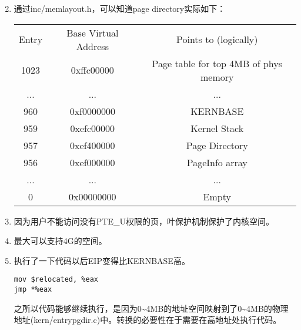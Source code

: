\begin{answer}
    \begin{enumerate}
        \setcounter{enumi}{1}
    \item 通过inc/memlayout.h，可以知道page directory实际如下：
        \begin{center}
            \begin{tabular}{c c c}
                \toprule
                Entry & Base Virtual Address & Points to (logically) \\
                \cmidrule(lr){1-3}
                1023 & 0xffc00000 & Page table for top 4MB of phys memory \\
                ...  & ...        & ...           \\
                960  & 0xf0000000 & KERNBASE      \\
                959  & 0xefc00000 & Kernel Stack  \\
                957  & 0xef400000 & Page Directory\\
                956  & 0xef000000 & PageInfo array\\
                ...  & ...        & ...           \\
                0    & 0x00000000 & Empty         \\
                \bottomrule
            \end{tabular}
        \end{center}
    \item 因为用户不能访问没有PTE\_U权限的页，叶保护机制保护了内核空间。
    \item 最大可以支持4G的空间。
    \item 执行了一下代码以后EIP变得比KERNBASE高。
        \begin{lstlisting}
mov	$relocated, %eax
jmp	*%eax
        \end{lstlisting}
        \par 之所以代码能够继续执行，是因为0\textasciitilde 4MB的地址空间映射到了0\textasciitilde 4MB的物理地址(kern/entrypgdir.c)中。转换的必要性在于需要在高地址处执行代码。
\end{enumerate}
\end{answer}


